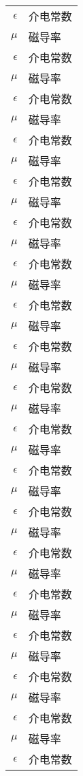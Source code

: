 \begin{mainsymbol}
\label{chap:symb}

\begin{longtable}{rl}
$\epsilon$     & 介电常数 \\
 $\mu$ 		& 磁导率 \\
 $\epsilon$     & 介电常数 \\
 $\mu$ 		& 磁导率 \\
 $\epsilon$     & 介电常数 \\
 $\mu$ 		& 磁导率 \\
 $\epsilon$ 	& 介电常数 \\
 $\mu$ 		& 磁导率 \\
 $\epsilon$     & 介电常数 \\
 $\mu$ 		& 磁导率 \\
 $\epsilon$     & 介电常数 \\
 $\mu$ 		& 磁导率 \\
 $\epsilon$     & 介电常数 \\
 $\mu$ 		& 磁导率 \\
 $\epsilon$ 	& 介电常数 \\
 $\mu$ 		& 磁导率 \\
 $\epsilon$     & 介电常数 \\
 $\mu$ 		& 磁导率 \\
 $\epsilon$     & 介电常数 \\
 $\mu$ 		& 磁导率 \\
 $\epsilon$     & 介电常数 \\
 $\mu$ 		& 磁导率 \\
 $\epsilon$ 	& 介电常数 \\
 $\mu$ 		& 磁导率 \\
 $\epsilon$     & 介电常数 \\
 $\mu$ 		& 磁导率 \\
 $\epsilon$     & 介电常数 \\
 $\mu$ 		& 磁导率 \\
 $\epsilon$     & 介电常数 \\
 $\mu$ 		& 磁导率 \\
 $\epsilon$ 	& 介电常数 \\
 $\mu$ 		& 磁导率 \\
 $\epsilon$     & 介电常数 \\
 $\mu$ 		& 磁导率 \\
 $\epsilon$     & 介电常数 \\
 $\mu$ 		& 磁导率 \\
 $\epsilon$     & 介电常数 \\

\end{longtable}
\end{mainsymbol}
